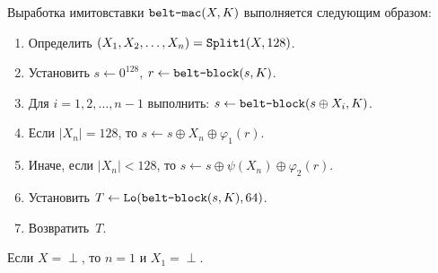 Выработка имитовставки $\texttt{belt-mac}(X,K)$ выполняется следующим образом:
\begin{enumerate}
\item
Определить $(X_1,X_2,\ldots,X_n)=\mathop{\texttt{Split1}}\nolimits(X,128)$.
\item
Установить
$s\leftarrow 0^{128}$, $r\leftarrow \texttt{belt-block}(s,K)$.
\item
Для $i=1,2,\ldots,n-1$ выполнить:
$s\leftarrow \texttt{belt-block}(s\oplus X_i,K)$.
\item
Если $|X_n|=128$, то 
$s\leftarrow s\oplus X_n\oplus \varphi_1(r)$.
\item
Иначе, если $|X_n|<128$, то
$s\leftarrow s\oplus\psi(X_n)\oplus\varphi_2(r)$.
\item
Установить
$T\leftarrow\mathop{\texttt{Lo}}\nolimits(\texttt{belt-block}(s,K), 64)$.
\item
Возвратить~$T$.
\end{enumerate}

\begin{note*}
Если $X=\perp$, то $n=1$ и $X_1=\perp$.
\end{note*}
